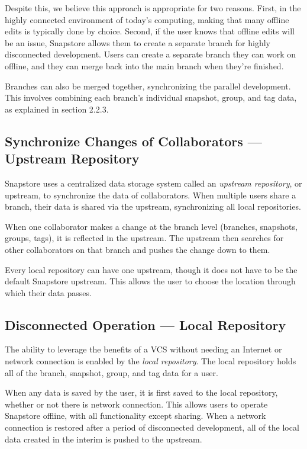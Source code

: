 Despite this, we believe this approach is appropriate for two reasons. First, in the highly connected environment of today's computing, making that many offline edits is typically done by choice. Second, if the user knows that offline edits will be an issue, Snapstore allows them to create a separate branch for highly disconnected development. Users can create a separate branch they can work on offline, and they can merge back into the main branch when they're finished.

Branches can also be merged together, synchronizing the parallel development. This involves combining each branch's individual snapshot, group, and tag data, as explained in section 2.2.3.

\subsection{Synchronize Changes of Collaborators --- Upstream Repository}

Snapstore uses a centralized data storage system called an \textit{upstream repository}, or upstream, to synchronize the data of collaborators. When multiple users share a branch, their data is shared via the upstream, synchronizing all local repositories.

When one collaborator makes a change at the branch level (branches, snapshots, groups, tags), it is reflected in the upstream. The upstream then searches for other collaborators on that branch and pushes the change down to them.

Every local repository can have one upstream, though it does not have to be the default Snapstore upstream. This allows the user to choose the location through which their data passes.

\subsection{Disconnected Operation --- Local Repository}

The ability to leverage the benefits of a VCS without needing an Internet or network connection is enabled by the \textit{local repository}. The local repository holds all of the branch, snapshot, group, and tag data for a user.

When any data is saved by the user, it is first saved to the local repository, whether or not there is network connection. This allows users to operate Snapstore offline, with all functionality except sharing. When a network connection is restored after a period of disconnected development, all of the local data created in the interim is pushed to the upstream.

